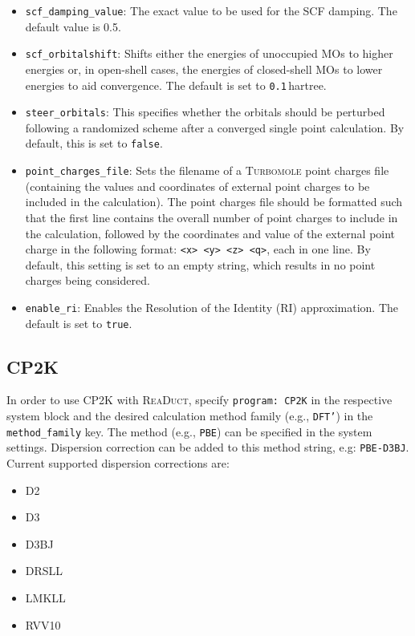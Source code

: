 \documentclass[]{tufte-book}
\begin{document}
\begin{itemize}
\item \texttt{scf\_damping\_value}: The exact value to be used for the SCF damping. The default value is 0.5.
\item \texttt{scf\_orbitalshift}: Shifts either the energies of unoccupied MOs to higher energies or, in open-shell cases, the energies of closed-shell MOs to lower energies to aid convergence. The default is set to \texttt{0.1}\,hartree.
\item \texttt{steer\_orbitals}: This specifies whether the orbitals should be perturbed  following a randomized scheme after a converged single point calculation\cite{orbitalperturbation}. By default, this is set to \texttt{false}.
\item \texttt{point\_charges\_file}: Sets the filename of a \textsc{Turbomole} point charges file (containing the values and coordinates of
external point charges to be included in the calculation). The point charges file should be formatted such that the first line contains the overall number of point charges to include in the calculation, followed by the coordinates and value of the external point charge in the following format: \texttt{<x> <y> <z> <q>}, each in one line. By default, this setting is set to an empty string, which results
in no point charges being considered.
\item \texttt{enable\_ri}: Enables the Resolution of the Identity (RI) approximation. The default is set to \texttt{true}. 
\end{itemize}

\subsection{\textsc{CP2K}}

In order to use \textsc{CP2K} with \textsc{ReaDuct}, specify \texttt{program: CP2K} in the respective system block and the desired
calculation method family (e.g., \texttt{DFT'}) in the \texttt{method\_family} key.
The method (e.g., \texttt{PBE}) can be specified in the system settings. Dispersion correction can be added to this method string, e.g: \texttt{PBE-D3BJ}. Current supported dispersion corrections are:
\begin{itemize}
 	\item D2
 	\item D3
 	\item D3BJ
 	\item DRSLL
 	\item LMKLL
 	\item RVV10
\end{itemize}
\end{document}
